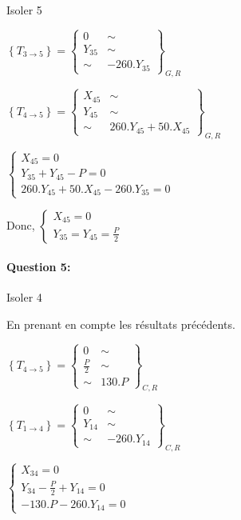 Isoler 5

$\left\{T_{3\rightarrow 5}\right\}=\left\{
\begin{array}{cc}
0 & \sim \\
Y_{35} & \sim \\
\sim & -260.Y_{35}
\end{array}
\right\}_{G,R}$

$\left\{T_{4\rightarrow 5}\right\}=\left\{
\begin{array}{cc}
X_{45} & \sim \\
Y_{45} & \sim \\
\sim & 260.Y_{45}+50.X_{45}
\end{array}
\right\}_{G,R}$

$\left\{\begin{array}{l}
X_{45}=0 \\
Y_{35}+Y_{45}-P=0 \\
260.Y_{45}+50.X_{45}-260.Y_{35}=0
\end{array}\right.$

Donc, $\left\{\begin{array}{l}
X_{45}=0 \\
Y_{35}=Y_{45}=\frac{P}{2}
\end{array}\right.$

\paragraph{Question 5:}

Isoler 4

En prenant en compte les résultats précédents.

$\left\{T_{4\rightarrow 5}\right\}=\left\{
\begin{array}{cc}
0 & \sim \\
\frac{P}{2} & \sim \\
\sim & 130.P
\end{array}
\right\}_{C,R}$

$\left\{T_{1\rightarrow 4}\right\}=\left\{
\begin{array}{cc}
0 & \sim \\
Y_{14} & \sim \\
\sim & -260.Y_{14}
\end{array}
\right\}_{C,R}$

$\left\{\begin{array}{l}
X_{34}=0 \\
Y_{34}-\frac{P}{2}+Y_{14}=0 \\
-130.P-260.Y_{14}=0
\end{array}\right.$


